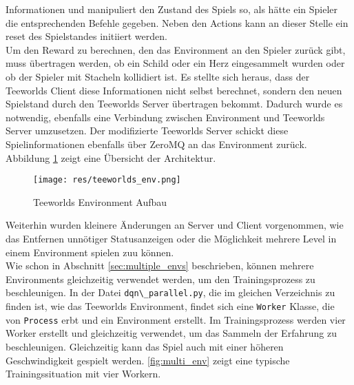 \documentclass[11pt]{scrartcl}
\begin{document}
Informationen und manipuliert den Zustand des Spiels so, als hätte ein Spieler die
entsprechenden Befehle gegeben. Neben den Actions kann an dieser Stelle ein reset des
Spielstandes initiiert werden.\\ %
Um den Reward zu berechnen, den das Environment an den Spieler zurück gibt, muss
übertragen werden, ob ein Schild oder ein Herz eingesammelt wurden oder ob der Spieler mit
Stacheln kollidiert ist. Es stellte sich heraus, dass der Teeworlds Client diese Informationen
nicht selbst berechnet, sondern den neuen Spielstand durch den Teeworlds Server übertragen bekommt.
Dadurch wurde es notwendig, ebenfalls eine Verbindung zwischen Environment und Teeworlds Server
umzusetzen. Der modifizierte Teeworlds Server schickt diese Spielinformationen ebenfalls über
ZeroMQ an das Environment zurück. Abbildung \ref{fig:teeworlds_env} zeigt eine Übersicht der
Architektur.

\begin{figure}[htp]
  \centering
  \texttt{[image: res/teeworlds\_env.png]}
  \caption{Teeworlds Environment Aufbau}
  \label{fig:teeworlds_env}
\end{figure}
\noindent
Weiterhin wurden kleinere Änderungen an Server und Client vorgenommen, wie das Entfernen
unnötiger Statusanzeigen oder die Möglichkeit mehrere Level in einem Environment spielen
zuu können.\\ %
Wie schon in Abschnitt \ref{sec:multiple_envs} beschrieben, können mehrere Environments
gleichzeitig verwendet werden, um den Trainingsprozess zu beschleunigen. In der Datei
\lstinline!dqn\_parallel.py!, die im gleichen Verzeichnis zu finden ist, wie das Teeworlds
Environment, findet sich eine \lstinline!Worker! Klasse, die von \lstinline!Process! erbt
und ein Environment erstellt. Im Trainingsprozess werden vier Worker erstellt und
gleichzeitig verwendet, um das Sammeln der Erfahrung zu beschleunigen. Gleichzeitig kann
das Spiel auch mit einer höheren Geschwindigkeit gespielt werden. \autoref{fig:multi_env}
zeigt eine typische Trainingssituation mit vier Workern.
\end{document}
